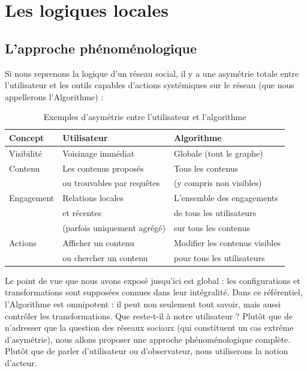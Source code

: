 \documentclass{report}
\begin{document}
	
	
	
	\part{Les logiques locales}
	
	
	\chapter{L'approche phénoménologique}
	
	Si nous reprenons la logique d'un réseau social, il y a une asymétrie totale entre l'utilisateur et les outils capables d'actions systémiques sur le réseau (que nous appellerons l'Algorithme) : 
	
	\begin{table}[H]
		\centering
		\begin{tabular}{|l|l|l|}
			\hline 
			\textbf{Concept} & \textbf{Utilisateur} & \textbf{Algorithme} \\
			\hline 
			Visibilité & Voisinage immédiat  & Globale (tout le graphe) \\
			\hline 
			Contenu & Les contenus proposés & Tous les contenus \\
			& ou trouvables par requêtes & (y compris non visibles) \\
			\hline 
			Engagement & Relations locales  & L'ensemble des engagements \\
			& et récentes & de tous les utilisateurs \\
			& (parfois uniquement agrégé) & sur tous les contenus \\
			\hline 
			Actions & Afficher un contenu & Modifier les contenus visibles \\
			& ou chercher un contenu & pour tous les utilisateurs \\
			\hline 
		\end{tabular}
		\caption{Exemples d'asymétrie entre l'utilisateur et l'algorithme} 
	\end{table}
	
	Le point de vue que nous avons exposé jusqu'ici est global : les configurations et transformations sont supposées connues dans leur intégralité. Dans ce référentiel, l'Algorithme est omnipotent : il peut non seulement tout savoir, mais aussi contrôler les transformations. Que reste-t-il à notre utilisateur ? Plutôt que de n'adresser que la question des réseaux sociaux (qui constituent un cas extrême d'asymétrie), nous allons proposer une approche phénoménologique complète. Plutôt que de parler d'utilisateur ou d'observateur, nous utiliserons la notion d'acteur. 
	
\end{document}
